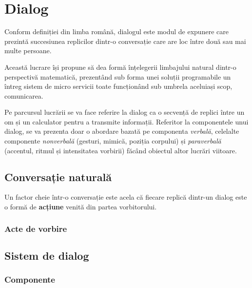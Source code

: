 \chapter{Dialog}

Conform definiției din limba română, dialogul este modul de expunere care prezintă succesiunea replicilor dintr-o conversație care are loc între două sau mai multe persoane.

Această lucrare își propune să dea formă înțelegerii limbajului natural dintr-o perspectivă matematică, prezentând sub forma unei soluții programabile un întreg sistem de micro servicii toate funcționând sub umbrela aceluiași scop, comunicarea.

Pe parcursul lucrării se va face referire la dialog ca o secvență de replici între un om și un calculator pentru a transmite informații.
Referitor la componentele unui dialog, se va prezenta doar o abordare bazată pe componenta \textit{verbală}, celelalte componente \textit{nonverbală} (gesturi, mimică, poziția corpului) și \textit{paraverbală} (accentul, ritmul și intensitatea vorbirii) făcând obiectul altor lucrări viitoare.


\section{Conversație naturală}

Un factor cheie într-o conversație este acela că fiecare replică dintr-un dialog este o formă de \textbf{acțiune} venită din partea vorbitorului. \cite{witt1953}


\subsection{Acte de vorbire}

\section{Sistem de dialog}

\subsection{Componente}
